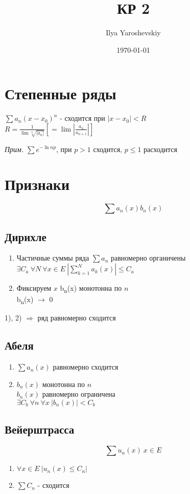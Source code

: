 \documentclass{article}
\author{Ilya Yaroshevskiy}
\date{\today}
\title{КР 2}
\begin{document}
\maketitle
\tableofcontents


\section{Степенные ряды}
\label{sec:orgda9c8f4}
\(\sum a_n(x - x_0)^n\) - сходится при \(|x - x_0| < R\) \\
\(R = \frac{1}{\lim{\sqrt[n]{|a_n|}}}[= \lim{\left|\frac{a_n}{a_{n + 1}}\right|}]\)

\emph{Прим.} \(\sum e^{-\ln{n}p}\), при \(p > 1\) сходится, \(p \le 1\) расходится

\section{Признаки}
\label{sec:org210b799}
\[ \sum a_n(x)b_n(x) \]
\subsection{Дирихле}
\label{sec:org6265a2f}
\begin{enumerate}
\item Частичные суммы ряда \(\sum a_n\) равномерно органичены \\
\(\exists C_a\ \forall N\ \forall x \in E\ |\sum_{k=1}^{N}a_k(x)| \le C_a\)
\item Фиксируем \(x\) b\textsubscript{n}(x) монотонна по \(n\) \\
b\textsubscript{n}(x) \(\rightarrow\) 0
\end{enumerate}
1), 2) \(\Rightarrow\) ряд равномерно сходится

\subsection{Абеля}
\label{sec:orgaf46b37}
\begin{enumerate}
\item \(\sum a_n(x)\) равномерно сходится
\item \(b_n(x)\) монотонна по \(n\) \\
\(b_n(x)\) равномерно ограничена \\
\(\exists C_b\ \forall n\ \forall x\ |b_n(x)| < C_b\)
\end{enumerate}
\subsection{Вейерштрасса}
\label{sec:org01836c9}
\[ \sum u_n(x)\ x \in E \]
\begin{enumerate}
\item \(\forall x \in E\ |u_n(x)\le C_n|\)
\item \(\sum C_n\) - сходится
\end{enumerate}
\end{document}
